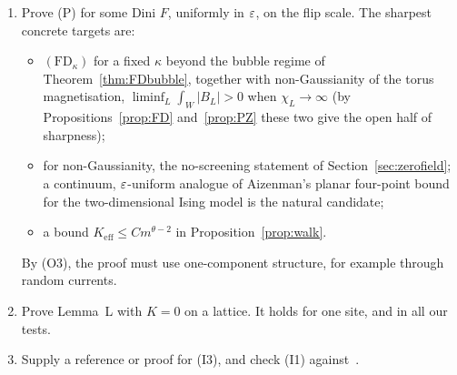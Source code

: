\begin{enumerate}
\item Prove (P) for some Dini $F$, uniformly in $\varepsilon$, on the flip scale. The sharpest concrete targets are:
\begin{itemize}
\item $(\mathrm{FD}_\kappa)$ for a fixed $\kappa$ beyond the bubble regime of Theorem~\ref{thm:FDbubble}, together with non-Gaussianity of the torus magnetisation, $\liminf_L\int_W|B_L|>0$ when $\chi_L\to\infty$ (by Propositions~\ref{prop:FD} and~\ref{prop:PZ} these two give the open half of sharpness);
\item for non-Gaussianity, the no-screening statement of Section~\ref{sec:zerofield}; a continuum, $\varepsilon$-uniform analogue of Aizenman's planar four-point bound for the two-dimensional Ising model is the natural candidate;
\item a bound $K_{\mathrm{eff}}\le Cm^{\theta-2}$ in Proposition~\ref{prop:walk}.
\end{itemize}
By (O3), the proof must use one-component structure, for example through random currents.
\item Prove Lemma~L with $K=0$ on a lattice. It holds for one site, and in all our tests.
\item Supply a reference or proof for (I3), and check (I1) against~\cite{BFS83,GRS76}.
\end{enumerate}
